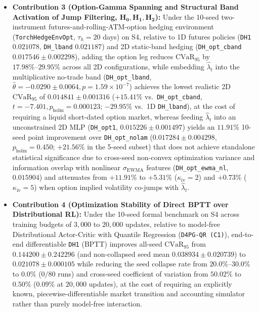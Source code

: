 \documentclass[11pt,a4paper]{article}
\begin{document}
\begin{itemize}
  \item \textbf{Contribution 3 (Option-Gamma Spanning and Structural Band Activation of Jump Filtering, $\mathbf{H_0, H_1, H_2}$):}
  Under the 10-seed two-instrument futures-and-rolling-ATM-option hedging environment (\texttt{TorchHedgeEnvOpt}, $\tau_h = 20$ days) on S4, relative to 1D futures policies (\texttt{DH1} $0.021078$, \texttt{DH\_lband} $0.021187$) and 2D static-band hedging (\texttt{DH\_opt\_cband} $0.017546 \pm 0.002298$), adding the option leg reduces $\text{CVaR}_{95}$ by $17.98\%\text{--}29.95\%$ across all 2D configurations, while embedding $\hat{\lambda}_t$ into the multiplicative no-trade band (\texttt{DH\_opt\_lband}, $\hat{\theta} = -0.0290 \pm 0.0064, p = 1.59 \times 10^{-7}$) achieves the lowest realistic 2D $\text{CVaR}_{95}$ of $0.014841 \pm 0.001316$ ($+15.41\%$ vs.\ \texttt{DH\_opt\_cband}, $t = -7.401, p_{\text{holm}} = 0.000123$; $-29.95\%$ vs.\ 1D \texttt{DH\_lband}), at the cost of requiring a liquid short-dated option market, whereas feeding $\hat{\lambda}_t$ into an unconstrained 2D MLP (\texttt{DH\_opt1}, $0.015226 \pm 0.001497$) yields an $11.91\%$ 10-seed point improvement over \texttt{DH\_opt\_nolam} ($0.017284 \pm 0.004298$, $p_{\text{holm}} = 0.450$; $+21.56\%$ in the 5-seed subset) that does not achieve standalone statistical significance due to cross-seed non-convex optimization variance and information overlap with nonlinear $\sigma_{\text{EWMA}}$ features (\texttt{DH\_opt\_ewma\_nl}, $0.015904$) and attenuates from $+11.91\%$ to $+5.31\%$ ($\kappa_{\text{iv}}=2$) and $+0.73\%$ ($\kappa_{\text{iv}}=5$) when option implied volatility co-jumps with $\hat{\lambda}_t$.

  \item \textbf{Contribution 4 (Optimization Stability of Direct BPTT over Distributional RL):}
  Under the 10-seed formal benchmark on S4 across training budgets of $3,000$ to $20,000$ updates, relative to model-free Distributional Actor-Critic with Quantile Regression (\texttt{D4PG-QR (C1)}), end-to-end differentiable \texttt{DH1} (BPTT) improves all-seed $\text{CVaR}_{95}$ from $0.144200 \pm 0.242296$ (and non-collapsed seed mean $0.038934 \pm 0.020739$) to $0.021078 \pm 0.000105$ while reducing the seed collapse rate from $20.0\%\text{--}30.0\%$ to $0.0\%$ ($0/80$ runs) and cross-seed coefficient of variation from $50.02\%$ to $0.50\%$ ($0.09\%$ at $20,000$ updates), at the cost of requiring an explicitly known, piecewise-differentiable market transition and accounting simulator rather than purely model-free interaction.
\end{itemize}
\end{document}
